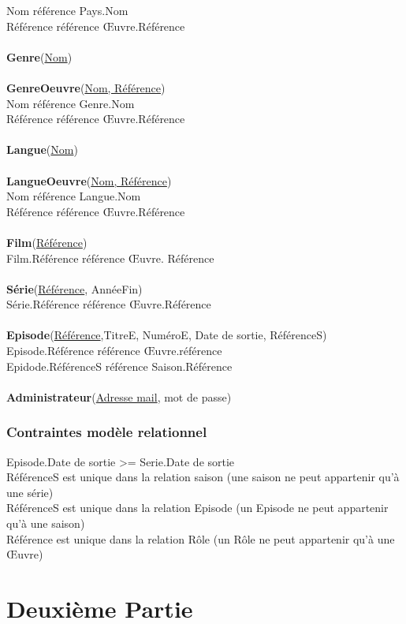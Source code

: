 \documentclass[10pt,a4paper]{article}
\begin{document}
		Nom référence Pays.Nom
        \\
		Référence référence Œuvre.Référence
\\ 
\\
\textbf{Genre}(\underline{Nom})
\\
\\
\textbf{GenreOeuvre}(\underline{Nom, Référence})
\\
		Nom référence Genre.Nom
    \\
		Référence référence Œuvre.Référence
\\
\\
\textbf{Langue}(\underline{Nom})
\\
\\
\textbf{LangueOeuvre}(\underline{Nom, Référence})
\\
	Nom référence Langue.Nom
    \\
	Référence référence Œuvre.Référence
\\
\\
\textbf{Film}(\underline{Référence})
\\
	Film.Référence référence Œuvre. Référence
\\
\\
\textbf{Série}(\underline{Référence}, AnnéeFin)
\\
	Série.Référence référence Œuvre.Référence
\\
\\
\textbf{Episode}(\underline{Référence},TitreE, NuméroE, Date de sortie, RéférenceS)
\\
		Episode.Référence référence Œuvre.référence
        \\
		Epidode.RéférenceS référence Saison.Référence
\\
\\
\textbf{Administrateur}(\underline{Adresse mail}, mot de passe)
\subsubsection{Contraintes modèle relationnel}
\noindent Episode.Date de sortie >= Serie.Date de sortie \\
RéférenceS est unique dans la relation saison (une saison ne peut appartenir qu’à une série) \\
RéférenceS est unique dans la relation Episode (un Episode ne peut appartenir qu’à une saison) \\
Référence est unique dans la relation Rôle (un Rôle ne peut appartenir qu’à une Œuvre)

\newpage
\section{Deuxième Partie}\label{deuxieme partie}
\end{document}
